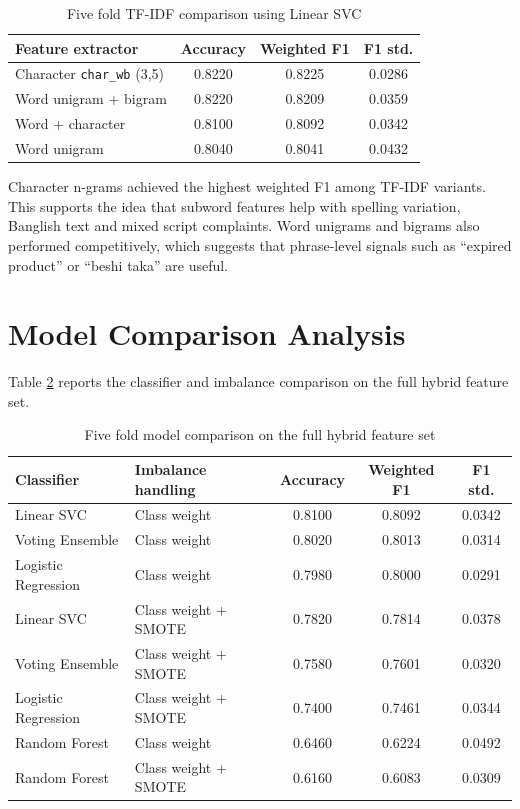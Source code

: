 \documentclass[12pt,a4paper,openany]{book}
\begin{document}
\begin{table}[H]
\centering
\caption{Five fold TF-IDF comparison using Linear SVC}
\label{tab:tfidf_comparison}
\begin{tabular}{lccc}
\toprule
\textbf{Feature extractor} & \textbf{Accuracy} & \textbf{Weighted F1} & \textbf{F1 std.}\\
\midrule
Character \texttt{char\_wb} (3,5) & 0.8220 & 0.8225 & 0.0286\\
Word unigram + bigram & 0.8220 & 0.8209 & 0.0359\\
Word + character & 0.8100 & 0.8092 & 0.0342\\
Word unigram & 0.8040 & 0.8041 & 0.0432\\
\bottomrule
\end{tabular}
\end{table}

Character n-grams achieved the highest weighted F1 among TF-IDF variants. This supports the idea that subword features help with spelling variation, Banglish text and mixed script complaints. Word unigrams and bigrams also performed competitively, which suggests that phrase-level signals such as ``expired product'' or ``beshi taka'' are useful.

\section{Model Comparison Analysis}
Table \ref{tab:model_comparison} reports the classifier and imbalance comparison on the full hybrid feature set.

\begin{table}[H]
\centering
\caption{Five fold model comparison on the full hybrid feature set}
\label{tab:model_comparison}
\scriptsize
\setlength{\tabcolsep}{3pt}
\begin{tabular}{p{}p{}ccc}
\toprule
\textbf{Classifier} & \textbf{Imbalance handling} & \textbf{Accuracy} & \textbf{Weighted F1} & \textbf{F1 std.}\\
\midrule
Linear SVC & Class weight & 0.8100 & 0.8092 & 0.0342\\
Voting Ensemble & Class weight & 0.8020 & 0.8013 & 0.0314\\
Logistic Regression & Class weight & 0.7980 & 0.8000 & 0.0291\\
Linear SVC & Class weight + SMOTE & 0.7820 & 0.7814 & 0.0378\\
Voting Ensemble & Class weight + SMOTE & 0.7580 & 0.7601 & 0.0320\\
Logistic Regression & Class weight + SMOTE & 0.7400 & 0.7461 & 0.0344\\
Random Forest & Class weight & 0.6460 & 0.6224 & 0.0492\\
Random Forest & Class weight + SMOTE & 0.6160 & 0.6083 & 0.0309\\
\bottomrule
\end{tabular}
\end{table}
\end{document}
